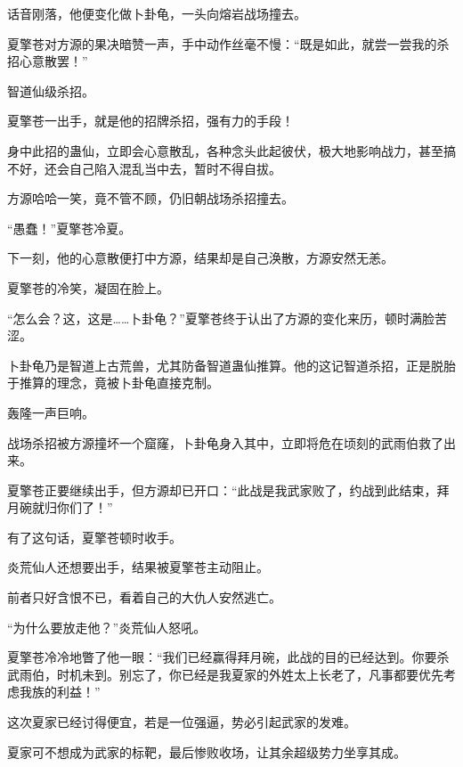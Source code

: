 \begin{this_body}
话音刚落，他便变化做卜卦龟，一头向熔岩战场撞去。

夏擎苍对方源的果决暗赞一声，手中动作丝毫不慢：“既是如此，就尝一尝我的杀招心意散罢！”

智道仙级杀招。

夏擎苍一出手，就是他的招牌杀招，强有力的手段！

身中此招的蛊仙，立即会心意散乱，各种念头此起彼伏，极大地影响战力，甚至搞不好，还会自己陷入混乱当中去，暂时不得自拔。

方源哈哈一笑，竟不管不顾，仍旧朝战场杀招撞去。

“愚蠢！”夏擎苍冷夏。

下一刻，他的心意散便打中方源，结果却是自己涣散，方源安然无恙。

夏擎苍的冷笑，凝固在脸上。

“怎么会？这，这是……卜卦龟？”夏擎苍终于认出了方源的变化来历，顿时满脸苦涩。

卜卦龟乃是智道上古荒兽，尤其防备智道蛊仙推算。他的这记智道杀招，正是脱胎于推算的理念，竟被卜卦龟直接克制。

轰隆一声巨响。

战场杀招被方源撞坏一个窟窿，卜卦龟身入其中，立即将危在顷刻的武雨伯救了出来。

夏擎苍正要继续出手，但方源却已开口：“此战是我武家败了，约战到此结束，拜月碗就归你们了！”

有了这句话，夏擎苍顿时收手。

炎荒仙人还想要出手，结果被夏擎苍主动阻止。

前者只好含恨不已，看着自己的大仇人安然逃亡。

“为什么要放走他？”炎荒仙人怒吼。

夏擎苍冷冷地瞥了他一眼：“我们已经赢得拜月碗，此战的目的已经达到。你要杀武雨伯，时机未到。别忘了，你已经是我夏家的外姓太上长老了，凡事都要优先考虑我族的利益！”

这次夏家已经讨得便宜，若是一位强逼，势必引起武家的发难。

夏家可不想成为武家的标靶，最后惨败收场，让其余超级势力坐享其成。

\end{this_body}

